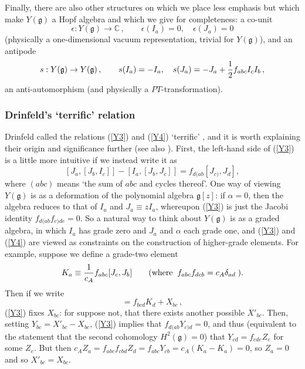 \documentclass[12pt]{article}
\newcommand{\gf}{\mathfrak{g}}
\begin{document}
Finally, there are also other structures on which we place less
emphasis but which make $Y(\gf)$ a Hopf algebra and which we give
for completeness: a co-unit \begin{equation} \epsilon: Y(\gf)\rightarrow
{\mathbb C}\,,\qquad \epsilon (I_a)=0,\quad\epsilon(J_a)=0\end{equation}
(physically a one-dimensional vacuum representation, trivial for
$Y(\gf)$), and an antipode \begin{equation} \label{antipode}s:Y(\gf)\rightarrow
Y(\gf)\,,\qquad s(I_a)=-I_a,\quad s(J_a)=-J_a+{1\over 2}f_{abc}I_c
I_b\,,\end{equation} an anti-automorphism (and physically a
$PT$-transformation).

\subsubsection{Drinfeld's `terrific' relation}

 Drinfeld
called the relations (\ref{Y3}) and (\ref{Y4}) `terrific'
\cite{drinf2}, and it is worth explaining their origin and
significance further (see also \cite{gron}). First, the left-hand
side of (\ref{Y3}) is a little more intuitive if we instead write
it as \begin{equation}\label{Y3'} [J_a,[J_b,I_c]]-[I_a,[J_b,J_c]] =
f_{d(ab}[J_{c)},J_d], \end{equation} where $(abc)$ means `the sum of $abc$
and cycles thereof'. One way of viewing $Y(\gf)$ is as a
deformation of the polynomial algebra $\gf[z]$: if $\alpha=0$, then
the algebra reduces to that of $I_a$ and $J_a\equiv z I_a$,
whereupon (\ref{Y3}) is just the Jacobi identity
$f_{d(ab}f_{c)de}=0$. So a natural way to think about $Y(\gf)$ is
as a graded algebra, in which $I_a$ has grade zero and $J_a$ and
$\alpha$ each grade one, and (\ref{Y3}) and (\ref{Y4}) are viewed
as constraints on the construction of higher-grade elements. For
example, suppose we define a grade-two element \begin{equation} K_a \equiv
{1\over c_A} f_{abc}[J_c,J_b] \qquad{\rm (where\;\;}
f_{abc}f_{dcb}=c_A \delta_{ad}\;). \end{equation} Then if we write\begin{equation}
[J_b,J_c]=f_{bcd}K_d + X_{bc}\,, \end{equation} (\ref{Y3}) fixes $X_{bc}$:
for suppose not, that there exists another possible $X'_{bc}$.
Then, setting $Y_{bc}=X'_{bc}-X_{bc}$, (\ref{Y3}) implies that
$f_{d(ab}Y_{c)d}=0$, and thus (equivalent to the statement
 that the second cohomology $H^2(\gf)=0$) that $Y_{cd}=f_{cde}Z_e$
 for some $Z_e$. But then
$c_A Z_a = f_{abc} f_{cbd}Z_d = f_{abc}Y_{cb}=c_A(K_a-K_a)=0$, so
$Z_a=0$ and so $X'_{bc}=X_{bc}$.
\end{document}
